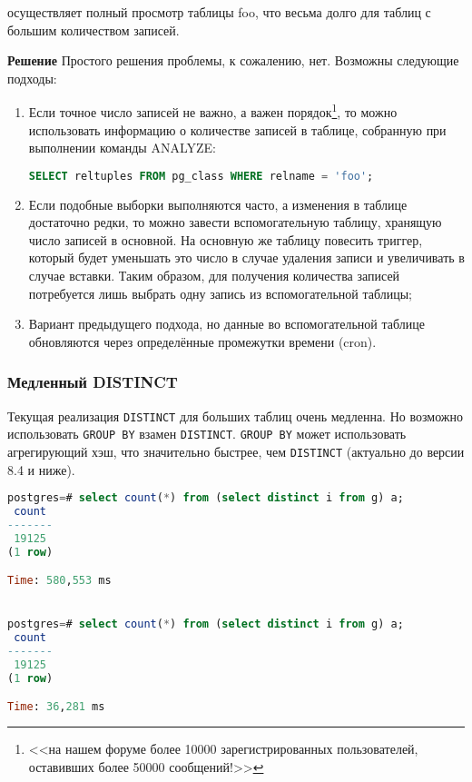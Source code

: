 осуществляет полный просмотр таблицы foo, что весьма долго для таблиц с большим количеством записей.

\textbf{Решение} Простого решения проблемы, к сожалению, нет. Возможны следующие подходы:

\begin{enumerate}
  \item Если точное число записей не важно, а важен порядок\footnote{<<на нашем форуме более 10000 зарегистрированных пользователей, оставивших более 50000 сообщений!>>}, то можно использовать информацию о количестве записей в таблице, собранную при выполнении команды ANALYZE:
\begin{lstlisting}[language=SQL,label=lst:sql_performance2,caption=SQL]
SELECT reltuples FROM pg_class WHERE relname = 'foo';
\end{lstlisting}
  \item Если подобные выборки выполняются часто, а изменения в таблице достаточно редки, то можно завести вспомогательную таблицу, хранящую число записей в основной. На основную же таблицу повесить триггер, который будет уменьшать это число в случае удаления записи и увеличивать в случае вставки. Таким образом, для получения количества записей потребуется лишь выбрать одну запись из вспомогательной таблицы;
  \item Вариант предыдущего подхода, но данные во вспомогательной таблице обновляются через определённые промежутки времени (cron).
\end{enumerate}


\subsubsection{Медленный DISTINCT}

Текущая реализация \lstinline!DISTINCT! для больших таблиц очень медленна. Но возможно использовать \lstinline!GROUP BY! взамен \lstinline!DISTINCT!. \lstinline!GROUP BY! может использовать агрегирующий хэш, что значительно быстрее, чем \lstinline!DISTINCT! (актуально до версии 8.4 и ниже).

\begin{lstlisting}[language=SQL,label=lst:sql_performance3,caption=DISTINCT]
postgres=# select count(*) from (select distinct i from g) a;
 count
-------
 19125
(1 row)

Time: 580,553 ms


postgres=# select count(*) from (select distinct i from g) a;
 count
-------
 19125
(1 row)

Time: 36,281 ms
\end{lstlisting}


